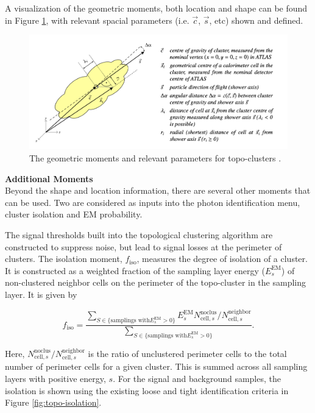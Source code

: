A visualization of the geometric moments, both location and shape can be found in Figure \ref{fig:topo-geom}, with relevant spacial parameters (i.e. $\vec{c}$, $\vec{s}$, etc) shown and defined.

\begin{figure}[!thp]
    \centering
    \includegraphics[width=.90\textwidth]{chapters/chapter4_photonID/images/geom-moments.png}

    \caption[The geometric moments and relevant parameters for topo-clusters.]
    {The geometric moments and relevant parameters for topo-clusters \cite{topo-clustering-r1}.}
    \label{fig:topo-geom}
\end{figure}


\noindent\textbf{Additional Moments}\\
\indent Beyond the shape and location information, there are several other moments that can be used. Two are considered as inputs into the photon identification menu, cluster isolation and \gls{EM} probability.

The signal thresholds built into the topological clustering algorithm are constructed to suppress noise, but lead to signal losses at the perimeter of clusters. The isolation moment, $f_{\text{iso}}$, measures the degree of isolation of a cluster. It is constructed as a weighted fraction of the sampling layer energy ($E_{s}^{\text{EM}}$) of non-clustered neighbor cells on the perimeter of the topo-cluster in the sampling layer. It is given by

\begin{equation}
    f_{\text{iso}} = \frac
    {
    \sum_{S \in \{ \text{samplings with} E_{s}^{\text{EM}} > 0 \} }  
    E_{s}^{\text{EM}} N_{\text{cell},s}^{\text{noclus}} / N_{\text{cell},s}^{\text{neighbor}}
    } 
    {
        \sum_{S \in \{ \text{samplings with} E_{s}^{\text{EM}} > 0 \} }
    }.
\end{equation}

Here, $N_{\text{cell},s}^{\text{noclus}} / N_{\text{cell},s}^{\text{neighbor}}$ is the ratio of unclustered perimeter cells to the total number of perimeter cells for a given cluster. This is summed across all sampling layers with positive energy, $s$. For the signal and background samples, the isolation is shown using the existing loose and tight identification criteria in Figure \ref{fig:topo-isolation}.

